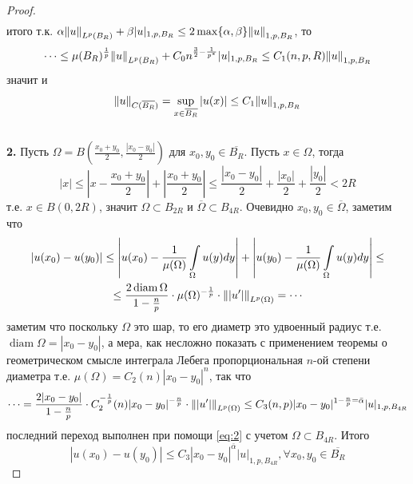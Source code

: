 \documentclass[12pt,a4paper]{article}
\newcommand{\intset}[1]{\int\limits_{#1}}
\DeclareMathOperator\diam{diam}
\begin{document}
\begin{proof}
\begin{multline}
	\end{multline}
	итого т.к. $\alpha \norm{u}_{L^p (B_R)} + \beta |u|_{1, p, B_R} \leq 2 \max\{\alpha, \beta\} \norm{u}_{1, p, B_R}$, то
	\begin{equation*}
		\cdots \leq \mu(B_R)^{\frac{1}{p}} \norm{u}_{L^p (B_R)} + C_0 n^{\frac{3}{2} - \frac{1}{p^*}} |u|_{1, p, B_R} \leq C_1(n, p, R) \norm{u}_{1, p, B_R}
	\end{equation*}
	значит и 
	\begin{equation}\label{eq:3}
		\norm{u}_{C(\overline{B_R})} = \sup\limits_{x \in \overline{B_R}}{|u(x)|} \leq C_1 \norm{u}_{1, p, B_R}
	\end{equation} \\
	\textbf{2.} Пусть $\Omega = B\left(\frac{x_0 + y_0}{2}, \frac{|x_0 - y_0|}{2}\right)$ для $x_0, y_0 \in \overline{B_R}$. Пусть $x \in \Omega$, тогда
	\begin{equation*}
		|x| \leq \left|x - \frac{x_0 + y_0}{2}\right| + \left|\frac{x_0 + y_0}{2}\right| \leq \frac{|x_0 - y_0|}{2} + \frac{|x_0|}{2} + \frac{|y_0|}{2} < 2R
	\end{equation*}
	т.е. $x \in B(0, 2R)$, значит $\Omega \subset B_{2R}$ и $\overline{\Omega} \subset B_{4R}$. Очевидно $x_0, y_0 \in \overline{\Omega}$, заметим что
	\begin{multline*}
		|u(x_0) - u(y_0)| \leq \left|u(x_0) - \frac{1}{\mu(\Omega)} \intset{\Omega}{u(y) dy}\right| + \left| u(y_0) - \frac{1}{\mu(\Omega)} \intset{\Omega}{u(y) dy} \right| \leq \\ \leq 
		\frac{2 \diam \Omega}{1 - \frac{n}{p}} \cdot \mu(\Omega)^{-\frac{1}{p}} \cdot \norm{|u^\prime|}_{L^p (\Omega)} = \cdots
	\end{multline*}
	заметим что поскольку $\Omega$ это шар, то его диаметр это удвоенный радиус т.е. $\diam \Omega = |x_0 - y_0|$, а мера, как несложно показать с применением теоремы о геометрическом смысле интеграла Лебега пропорциональная $n$-ой степени диаметра т.е. $\mu(\Omega) = C_2 (n) |x_0 - y_0|^n$, так что
	\begin{equation*}
		\cdots = \frac{2 |x_0 - y_0|}{1 - \frac{n}{p}} \cdot C_2^{-\frac{1}{p}} (n) |x_0 - y_0|^{-\frac{n}{p}} \cdot \norm{|u^\prime|}_{L^p (\Omega)} \leq C_3 (n, p) |x_0 - y_0|^{1 - \frac{n}{p} = \bar{\alpha}} |u|_{1, p, B_{4R}}
	\end{equation*}
	последний переход выполнен при помощи \eqref{eq:2} с учетом $\Omega \subset B_{4R}$. Итого
	\begin{equation*}
		|u(x_0) - u(y_0)| \leq  C_3 |x_0 - y_0|^{\bar{\alpha}} |u|_{1, p, B_{4R}}, \forall x_0, y_0 \in \overline{B_R}

\end{equation*}
\end{proof}
\end{document}
